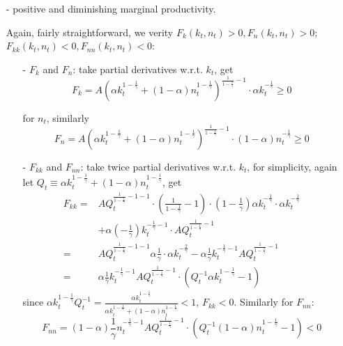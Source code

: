 \documentclass[10pt,landscape,a4paper]{article}
\begin{document}
\begin{multicols*}{3}
\begin{itemize}
    \item[-] positive and diminishing marginal productivity.
    
    Again, fairly straightforward, we verity $F_k(k_t,n_t)>0, F_n(k_t,n_t)>0$; $F_{kk}(k_t,n_t)<0,F_{nn}(k_t,n_t)<0$:
    \begin{itemize}
        \item[-] $F_k$ and $F_n$: take partial derivatives w.r.t. $k_t$, get
        $$
        F_k=A\left(\alpha k_t^{1-\frac{1}{\gamma}}+(1-\alpha)n_t^{1-\frac{1}{\gamma}}\right)^{\frac{1}{1-\frac{1}{\gamma}}-1}\cdot\alpha k_t^{-\frac{1}{\gamma}}\geq 0
        $$
        
        for $n_t$, similarly
        $$
        F_n=A\left(\alpha k_t^{1-\frac{1}{\gamma}}+(1-\alpha)n_t^{1-\frac{1}{\gamma}}\right)^{\frac{1}{1-\frac{1}{\gamma}}-1}\cdot(1-\alpha) n_t^{-\frac{1}{\gamma}}\geq 0
        $$
        
        \item[-] $F_{kk}$ and $F_{nn}$: take twice partial derivatives w.r.t. $k_t$, for simplicity, again let $Q_t\equiv \alpha k_t^{1-\frac{1}{\gamma}}+(1-\alpha)n_t^{1-\frac{1}{\gamma}}$, get
        \begin{align*}
            F_{kk} =& AQ_t^{\frac{1}{1-\frac{1}{\gamma}}-1-1}\cdot\left(\frac{1}{1-\frac{1}{\gamma}}-1\right)\cdot\left(1-\frac{1}{\gamma}\right)\alpha k_t^{-\frac{1}{\gamma}}\cdot \alpha k_t^{-\frac{1}{\gamma}}\\
            &+ \alpha\left(-\frac{1}{\gamma}\right)k_t^{-\frac{1}{\gamma}-1}\cdot AQ_t^{\frac{1}{1-\frac{1}{\gamma}}-1}\\
            =& AQ_t^{\frac{1}{1-\frac{1}{\gamma}}-1-1}\alpha \frac{1}{\gamma}\cdot \alpha k_t^{-\frac{2}{\gamma}}-\alpha\frac{1}{\gamma}k_t^{-\frac{1}{\gamma}-1}AQ_t^{\frac{1}{1-\frac{1}{\gamma}}-1}\\
            =& \alpha \frac{1}{\gamma}k_t^{-\frac{1}{\gamma}-1}AQ_t^{\frac{1}{1-\frac{1}{\gamma}}-1}\cdot \left( Q_t^{-1}\alpha k_t^{1-\frac{1}{\gamma}} -1\right)
        \end{align*}
        since $\alpha k_t^{1-\frac{1}{\gamma}}Q_t^{-1}=\frac{\alpha k_t^{1-\frac{1}{\gamma}}}{\alpha k_t^{1-\frac{1}{\gamma}}+(1-\alpha) n_t^{1-\frac{1}{\gamma}}}<1$, $F_{kk}<0$. Similarly for $F_{nn}$:
        $$
            F_{nn} = (1-\alpha) \frac{1}{\gamma}n_t^{-\frac{1}{\gamma}-1}AQ_t^{\frac{1}{1-\frac{1}{\gamma}}-1}\cdot \left( Q_t^{-1}(1-\alpha) n_t^{1-\frac{1}{\gamma}} -1\right)<0
        $$
        

\end{itemize}
\end{itemize}
\end{multicols*}
\end{document}
